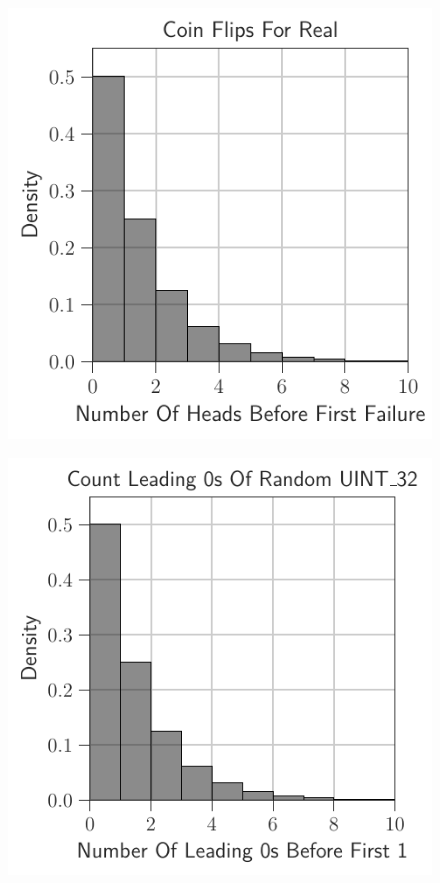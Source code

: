\documentclass[12pt]{article}
\begin{document}
\begin{figure}[H]
	\centering
	\begin{minipage}{0.32\textwidth}
		\centering
		\includegraphics[width=\linewidth]{../notebook/plot/coin_flips_for_real.pdf}
		\label{fig:coin_flips_for_real}
	\end{minipage}\hfill
	\begin{minipage}{0.32\textwidth}
		\centering
		\includegraphics[width=\linewidth]{../notebook/plot/count_leading_0s_of_random_uint_32.pdf}

\end{minipage}
\end{figure}
\end{document}
